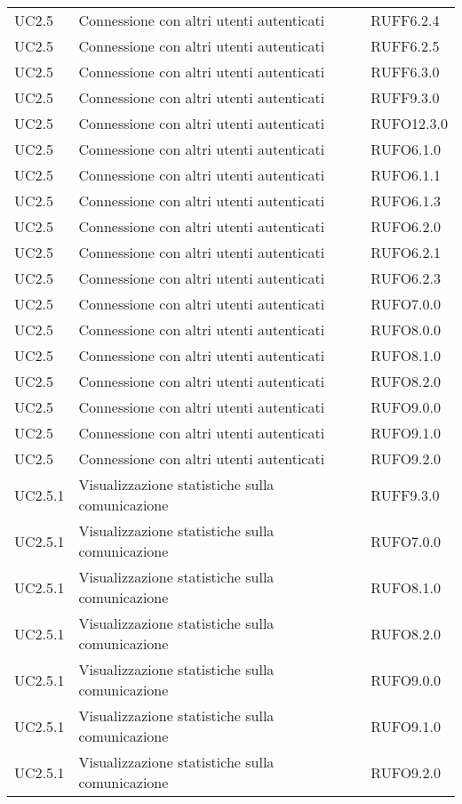 \begin{longtable}{lp{}l}
UC2.5 & Connessione con altri utenti autenticati & RUFF6.2.4 \\
UC2.5 & Connessione con altri utenti autenticati & RUFF6.2.5 \\
UC2.5 & Connessione con altri utenti autenticati & RUFF6.3.0 \\
UC2.5 & Connessione con altri utenti autenticati & RUFF9.3.0 \\
UC2.5 & Connessione con altri utenti autenticati & RUFO12.3.0 \\
UC2.5 & Connessione con altri utenti autenticati & RUFO6.1.0 \\
UC2.5 & Connessione con altri utenti autenticati & RUFO6.1.1 \\
UC2.5 & Connessione con altri utenti autenticati & RUFO6.1.3 \\
UC2.5 & Connessione con altri utenti autenticati & RUFO6.2.0 \\
UC2.5 & Connessione con altri utenti autenticati & RUFO6.2.1 \\
UC2.5 & Connessione con altri utenti autenticati & RUFO6.2.3 \\
UC2.5 & Connessione con altri utenti autenticati & RUFO7.0.0 \\
UC2.5 & Connessione con altri utenti autenticati & RUFO8.0.0 \\
UC2.5 & Connessione con altri utenti autenticati & RUFO8.1.0 \\
UC2.5 & Connessione con altri utenti autenticati & RUFO8.2.0 \\
UC2.5 & Connessione con altri utenti autenticati & RUFO9.0.0 \\
UC2.5 & Connessione con altri utenti autenticati & RUFO9.1.0 \\
UC2.5 & Connessione con altri utenti autenticati & RUFO9.2.0 \\
UC2.5.1 & Visualizzazione statistiche sulla comunicazione & RUFF9.3.0 \\
UC2.5.1 & Visualizzazione statistiche sulla comunicazione & RUFO7.0.0 \\
UC2.5.1 & Visualizzazione statistiche sulla comunicazione & RUFO8.1.0 \\
UC2.5.1 & Visualizzazione statistiche sulla comunicazione & RUFO8.2.0 \\
UC2.5.1 & Visualizzazione statistiche sulla comunicazione & RUFO9.0.0 \\
UC2.5.1 & Visualizzazione statistiche sulla comunicazione & RUFO9.1.0 \\
UC2.5.1 & Visualizzazione statistiche sulla comunicazione & RUFO9.2.0 \\
\bottomrule
\end{longtable}
